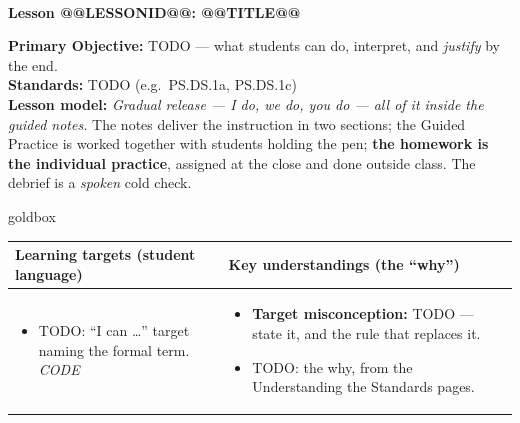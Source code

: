 \documentclass[10pt]{article}
\makeatletter
\newcommand{\LessonNumberName}{Lesson @@LESSONID@@: @@TITLE@@}
\makeatother
\begin{document}
\begin{center}
    {\Large\bfseries \CourseName \\
    {\small\bfseries \UnitNumberName \LessonNumberName}}
\end{center}

\begin{tcolorbox}[colback=frost, colframe=cerulean, boxrule=0.9pt, arc=2mm,
    left=2mm, right=2mm, top=1.5mm, bottom=1.5mm]
    \textbf{Primary Objective:} TODO --- what students can do, interpret, and \emph{justify}
    by the end.
    \\[2pt]
    \textbf{Standards:} TODO (e.g.\ PS.DS.1a, PS.DS.1c)
    \\[2pt]
    \textbf{Lesson model:} \emph{Gradual release --- I do, we do, you do --- all of it inside
    the guided notes.} The notes deliver the instruction in two sections; the Guided Practice is
    worked together with students holding the pen; \textbf{the homework is the individual
    practice}, assigned at the close and done outside class. The debrief is a \emph{spoken} cold check.
\end{tcolorbox}

\renewcommand{\arraystretch}{1.4}
\boxguard
\begin{skillbox}{goldbox}
\begin{tabularx}{\linewidth}{@{}X|X@{}}
\textbf{Learning targets (student language)} & \textbf{Key understandings (the ``why'')} \\[2pt]
\hline
\vspace{-6pt}
\begin{itemize}[leftmargin=1.1em, nosep, after=\vspace{2pt}]
  \item TODO: ``I can \dots'' target naming the formal term. \hfill \textit{CODE}
\end{itemize}
&
\vspace{-6pt}
\begin{itemize}[leftmargin=1.1em, nosep, after=\vspace{2pt}]
  \item \textbf{Target misconception:} TODO --- state it, and the rule that replaces it.
  \item TODO: the why, from the Understanding the Standards pages.
\end{itemize}
\end{tabularx}
\end{skillbox}
\end{document}
